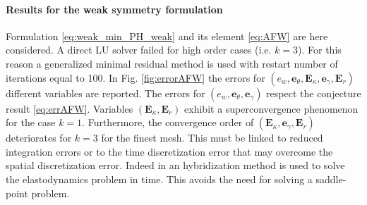 \documentclass{ifacconf}
\begin{document}
\paragraph{Results for the weak symmetry formulation} 
Formulation \eqref{eq:weak_min_PH_weak} and its element \eqref{eq:AFW} are here considered. A direct LU solver failed for high order cases (i.e. $k=3$). For this reason a generalized minimal residual method is used with restart number of iterations equal to 100. In Fig. \ref{fig:errorAFW} the errors for $(e_w, \bm{e}_\theta, \bm{E}_\kappa, \bm{e}_\gamma, \bm{E}_r)$ different variables are reported. The errors for $(e_w, \bm{e}_\theta, \bm{e}_\gamma)$ respect the conjecture result \eqref{eq:errAFW}. Variables $(\bm{E}_\kappa, \bm{E}_r)$ exhibit a superconvergence phenomenon for the case $k=1$. Furthermore, the convergence order of $(\bm{E}_\kappa, \bm{e}_\gamma, \bm{E}_r)$ deteriorates for $k=3$ for the finest mesh. This must be linked to reduced integration errors or to the time discretization error that may overcome the spatial discretization error. Indeed in \cite{ArnoldWeak} an hybridization method is used to solve the elastodynamics problem in time. This avoids the need for solving a saddle-point problem.
\end{document}
